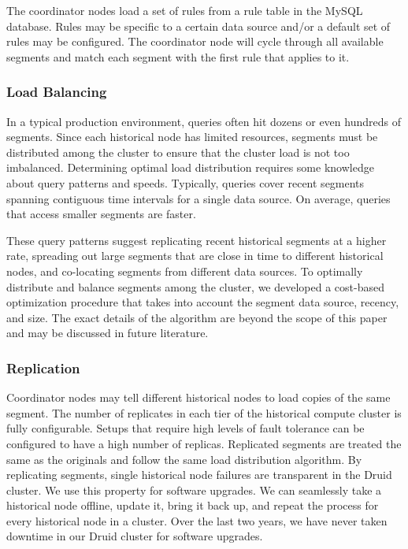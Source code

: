 \documentclass{acm_proc_article-sp}
\begin{document}
The coordinator nodes load a set of rules from a rule table in the MySQL
database. Rules may be specific to a certain data source and/or a default set
of rules may be configured. The coordinator node will cycle through all available
segments and match each segment with the first rule that applies to it.

\subsubsection{Load Balancing}
In a typical production environment, queries often hit dozens or even hundreds
of segments. Since each historical node has limited resources, segments must be
distributed among the cluster to ensure that the cluster load is not too
imbalanced. Determining optimal load distribution requires some knowledge about
query patterns and speeds. Typically, queries cover recent segments spanning
contiguous time intervals for a single data source.  On average, queries that
access smaller segments are faster.

These query patterns suggest replicating recent historical segments at a higher
rate, spreading out large segments that are close in time to different
historical nodes, and co-locating segments from different data sources.  To
optimally distribute and balance segments among the cluster, we developed a
cost-based optimization procedure that takes into account the segment data
source, recency, and size. The exact details of the algorithm are beyond the
scope of this paper and may be discussed in future literature.

\subsubsection{Replication}
Coordinator nodes may tell different historical nodes to load copies of the
same segment. The number of replicates in each tier of the historical compute
cluster is fully configurable. Setups that require high levels of fault
tolerance can be configured to have a high number of replicas. Replicated
segments are treated the same as the originals and follow the same load
distribution algorithm. By replicating segments, single historical node
failures are transparent in the Druid cluster. We use this property for
software upgrades. We can seamlessly take a historical node offline, update it,
bring it back up, and repeat the process for every historical node in a
cluster. Over the last two years, we have never taken downtime in our Druid
cluster for software upgrades.
\end{document}
